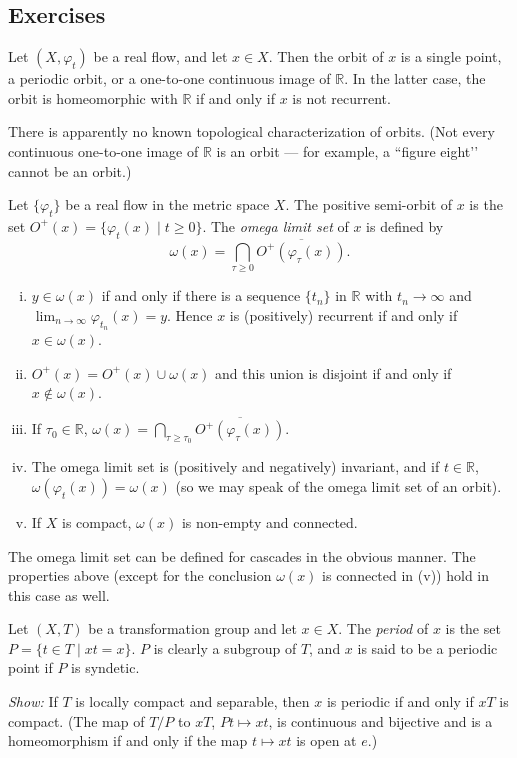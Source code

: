 \subsection*{Exercises}

\begin{exercise*}[1]
    Let $(X, \varphi_t)$ be a real flow, and let $x \in X$. Then the orbit of $x$ is a single point, a periodic orbit, or a one-to-one continuous image of $\mathbb{R}$. In the latter case, the orbit is homeomorphic with $\mathbb{R}$ if and only if $x$ is not recurrent.

    There is apparently no known topological characterization of orbits. (Not every continuous one-to-one image of $\mathbb{R}$ is an orbit — for example, a “figure eight’’ cannot be an orbit.)
\end{exercise*}


\begin{exercise*}[2]
    Let $\{\varphi_t\}$ be a real flow in the metric space $X$. The positive semi-orbit of $x$ is the set $O^+(x) = \{\varphi_t(x) \mid t \ge 0\}$. The \textit{omega limit set} of $x$ is defined by
    \[
        \omega(x) = \bigcap_{\tau \ge 0} \overline{O^+(\varphi_\tau(x))}.
    \]
    \begin{enumerate}[(i)]
        \item $y \in \omega(x)$ if and only if there is a sequence $\{t_n\}$ in $\mathbb{R}$ with $t_n \to \infty$ and $\lim_{n \to \infty} \varphi_{t_n}(x) = y$. Hence $x$ is (positively) recurrent if and only if $x \in \omega(x)$.
        \item $O^+(x) = O^+(x) \cup \omega(x)$ and this union is disjoint if and only if $x \notin \omega(x)$.
        \item If $\tau_0 \in \mathbb{R}$, $\omega(x) = \bigcap_{\tau \ge \tau_0} \overline{O^+(\varphi_\tau(x))}$.
        \item The omega limit set is (positively and negatively) invariant, and if $t \in \mathbb{R}$, $\omega(\varphi_t(x)) = \omega(x)$ (so we may speak of the omega limit set of an orbit).
        \item If $X$ is compact, $\omega(x)$ is non-empty and connected.
    \end{enumerate}
    The omega limit set can be defined for cascades in the obvious manner. The properties above (except for the conclusion $\omega(x)$ is connected in (v)) hold in this case as well.
\end{exercise*}


\begin{exercise*}[3]
    Let $(X, T)$ be a transformation group and let $x \in X$. The \textit{period} of $x$ is the set $P = \{t \in T \mid x t = x\}$. $P$ is clearly a subgroup of $T$, and $x$ is said to be a periodic point if $P$ is syndetic.

    \textit{Show:} If $T$ is locally compact and separable, then $x$ is periodic if and only if $xT$ is compact. (The map of $T/P$ to $xT$, $Pt \mapsto x t$, is continuous and bijective and is a homeomorphism if and only if the map $t \mapsto x t$ is open at $e$.)
\end{exercise*}


